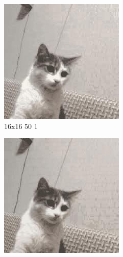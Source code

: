 \documentclass[12pt,a4paper]{article}
\begin{document}
\begin{figure}[H]
\medskip
\begin{subfigure}{0.25\textwidth}
  \includegraphics[width=\linewidth]{images/small/16-16-50-1}
  \caption{16x16 50 1}
  \label{fig:4}
\end{subfigure}\hfil %
\begin{subfigure}{0.25\textwidth}
  \includegraphics[width=\linewidth]{images/small/16-16-100-05}

\end{subfigure}
\end{figure}
\end{document}
